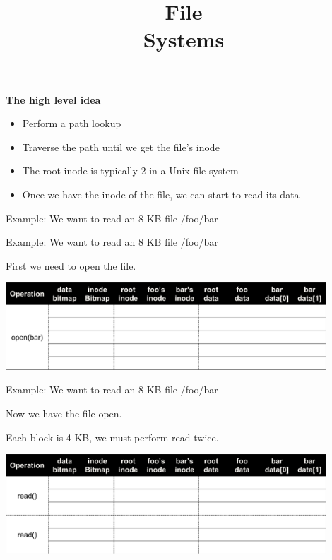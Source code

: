 

\title{File\\Systems}



\begin{frame}
    \titlepage
\end{frame}

\begin{slide}

    \textbf{The high level idea}
    \begin{itemize}
        \item Perform a path lookup
        \item Traverse the path until we get the file’s inode
        \item The root inode is typically 2 in a Unix file system
        \item Once we have the inode of the file, we can start to read its data
    \end{itemize}
    \bigskip

    Example: We want to read an 8 KB file /foo/bar
\end{slide}

\begin{slide}


    Example: We want to read an 8 KB file /foo/bar
    \bigskip

    First we need to open the file.
    \bigskip

    \includegraphics[width=120mm]{read-file-1.png}

\end{slide}

\begin{slide}


    Example: We want to read an 8 KB file /foo/bar
    \bigskip

    Now we have the file open.
    \bigskip

    Each block is 4 KB, we must perform read twice.
    \bigskip

    \includegraphics[width=120mm]{read-file-2.png}

\end{slide}

